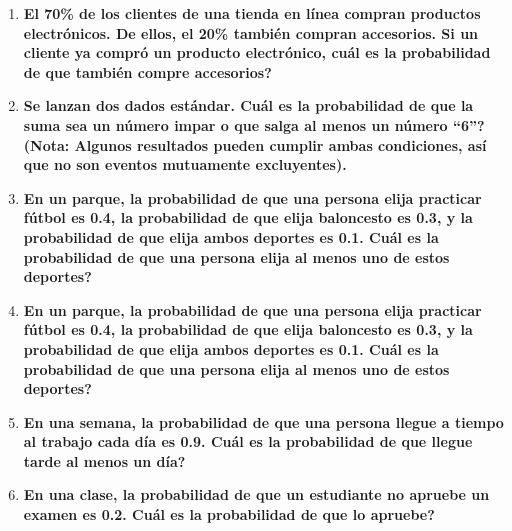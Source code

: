 \documentclass[12pt]{article}
\begin{document}
\begin{enumerate}[label=\textbf{\arabic*.}]
        \item \textbf{El 70\% de los clientes de una tienda en línea compran productos electrónicos.
        De ellos, el 20\% también compran accesorios. Si un cliente ya compró un
        producto electrónico, \textquestiondown cuál es la probabilidad de que también compre
        accesorios?}
        
        \item \textbf{Se lanzan dos dados estándar. \textquestiondown Cuál es la probabilidad de que la suma sea un
        número impar o que salga al menos un número ``6''? (Nota: Algunos resultados
        pueden cumplir ambas condiciones, así que no son eventos mutuamente
        excluyentes).}
        
        \item \textbf{En un parque, la probabilidad de que una persona elija practicar fútbol es 0.4, la
        probabilidad de que elija baloncesto es 0.3, y la probabilidad de que elija ambos
        deportes es 0.1. \textquestiondown Cuál es la probabilidad de que una persona elija al menos uno
        de estos deportes?}

        \item \textbf{En un parque, la probabilidad de que una persona elija practicar fútbol es 0.4, la
        probabilidad de que elija baloncesto es 0.3, y la probabilidad de que elija ambos
        deportes es 0.1. \textquestiondown Cuál es la probabilidad de que una persona elija al menos uno
        de estos deportes?}
        
        \item \textbf{En una semana, la probabilidad de que una persona llegue a tiempo al trabajo
        cada día es 0.9. \textquestiondown Cuál es la probabilidad de que llegue tarde al menos un día?}
        
        \item \textbf{En una clase, la probabilidad de que un estudiante no apruebe un examen es
        0.2. \textquestiondown Cuál es la probabilidad de que lo apruebe?}
        

\end{enumerate}
\end{document}
